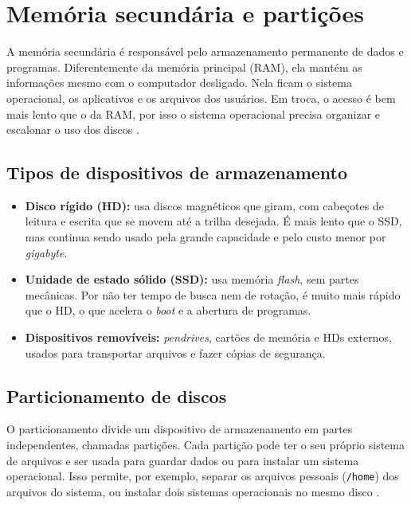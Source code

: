 \chapter{Memória secundária e partições}\label{cap:particoes}\label{cap:memoria-sec}

A memória secundária é responsável pelo armazenamento permanente de dados e programas.
Diferentemente da memória principal (RAM), ela mantém as informações mesmo com o computador
desligado. Nela ficam o sistema operacional, os aplicativos e os arquivos dos usuários. Em
troca, o acesso é bem mais lento que o da RAM, por isso o sistema operacional precisa
organizar e escalonar o uso dos discos \cite{silberschatz2015}.

\section{Tipos de dispositivos de armazenamento}\label{sec:tipos-armazenamento}

\begin{itemize}
    \item \textbf{Disco rígido (HD):} usa discos magnéticos que giram, com cabeçotes de leitura
    e escrita que se movem até a trilha desejada. É mais lento que o SSD, mas continua sendo
    usado pela grande capacidade e pelo custo menor por \textit{gigabyte}.
    \item \textbf{Unidade de estado sólido (SSD):} usa memória \textit{flash}, sem partes
    mecânicas. Por não ter tempo de busca nem de rotação, é muito mais rápido que o HD, o que
    acelera o \textit{boot} e a abertura de programas.
    \item \textbf{Dispositivos removíveis:} \textit{pendrives}, cartões de memória e HDs
    externos, usados para transportar arquivos e fazer cópias de segurança.
\end{itemize}

\section{Particionamento de discos}\label{sec:particionamento}

O particionamento divide um dispositivo de armazenamento em partes independentes, chamadas
partições. Cada partição pode ter o seu próprio sistema de arquivos e ser usada para guardar
dados ou para instalar um sistema operacional. Isso permite, por exemplo, separar os arquivos
pessoais (\texttt{/home}) dos arquivos do sistema, ou instalar dois sistemas operacionais no
mesmo disco \cite{tanenbaum2016}.

